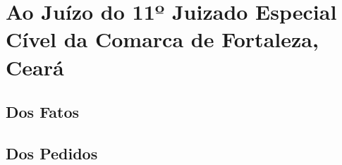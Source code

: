 \documentclass[
  12pt,
	oneside,
	a4paper,
	english,			%
	french,				%
	spanish,			%
  brazil
]{memoir}
\begin{document}
  \AddToShipoutPicture{\BackgroundPic}

\chapter{Ao Juízo do 11º Juizado Especial Cível da Comarca de Fortaleza, Ceará}

\lipsum[1]

\section{Dos Fatos}
\lipsum[1-3]

\section{Dos Pedidos}
\lipsum[1-3]

\hoje{}
\end{document}
